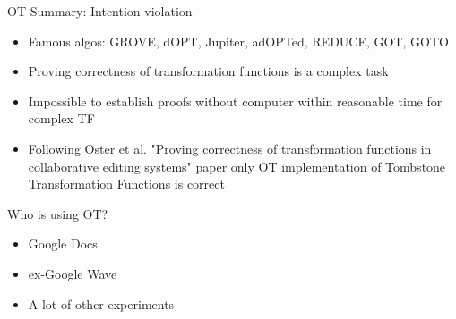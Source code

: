 \documentclass{beamer}
\begin{document}
\begin{frame}{OT Summary: Intention-violation}

\begin{itemize}
	\item Famous algos: GROVE, dOPT, Jupiter, adOPTed, REDUCE, GOT, GOTO
	\item Proving correctness of transformation functions is a complex task
	\item Impossible to establish proofs without computer within reasonable time for complex TF
	\item Following Oster et al. "Proving correctness of transformation functions in collaborative editing systems" paper only OT implementation of Tombstone Transformation Functions is correct
\end{itemize}
\end{frame}


\begin{frame}{Who is using OT?}

\begin{itemize}
	\item Google Docs
	\item ex-Google Wave
	\item A lot of other experiments
\end{itemize}
\end{frame}
\end{document}

